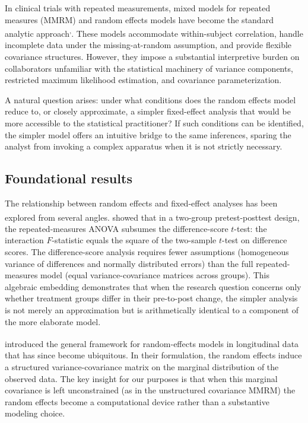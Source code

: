 \documentclass[
  11pt,
]{article}
\begin{document}
In clinical trials with repeated measurements, mixed
models for repeated measures (MMRM) and random
effects models have become the standard analytic
approach\textsuperscript{,}. These models
accommodate within-subject correlation, handle
incomplete data under the missing-at-random
assumption, and provide flexible covariance
structures. However, they impose a substantial
interpretive burden on collaborators unfamiliar with
the statistical machinery of variance components,
restricted maximum likelihood estimation, and
covariance parameterization.

A natural question arises: under what conditions does
the random effects model reduce to, or closely
approximate, a simpler fixed-effect analysis that
would be more accessible to the statistical
practitioner? If such conditions can be identified,
the simpler model offers an intuitive bridge to the
same inferences, sparing the analyst from invoking
a complex apparatus when it is not strictly
necessary.

\subsection{Foundational results}\label{foundational-results}

The relationship between random effects and
fixed-effect analyses has been explored from several
angles.\textsuperscript{} showed that in a
two-group pretest-posttest design, the
repeated-measures ANOVA subsumes the difference-score
\(t\)-test: the interaction \(F\)-statistic equals the
square of the two-sample \(t\)-test on difference
scores. The difference-score analysis requires fewer
assumptions (homogeneous variance of differences and
normally distributed errors) than the full
repeated-measures model (equal variance-covariance
matrices across groups). This algebraic embedding
demonstrates that when the research question
concerns only whether treatment groups differ in
their pre-to-post change, the simpler analysis is
not merely an approximation but is arithmetically
identical to a component of the more elaborate model.

\textsuperscript{} introduced the general framework
for random-effects models in longitudinal data that
has since become ubiquitous. In their formulation,
the random effects induce a structured
variance-covariance matrix on the marginal
distribution of the observed data. The key insight
for our purposes is that when this marginal
covariance is left unconstrained (as in the
unstructured covariance MMRM) the random effects
become a computational device rather than a
substantive modeling choice.
\end{document}
